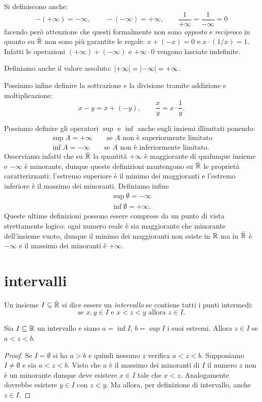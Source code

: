 Si definiscono anche:
\[
 -(+\infty) = -\infty, \qquad
 -(-\infty) = +\infty, \qquad
 \frac{1}{+\infty} = \frac{1}{-\infty}=0
\]
facendo però attenzione che
questi formalmente non sono \emph{opposto}
e \emph{reciproco} in quanto
su $\bar {{\mathbb R}}$ non sono più garantite
le regole: $x + (-x) = 0$ e $x \cdot (1/x) = 1$.
Infatti
le operazioni $(+\infty) + (-\infty)$ e $+\infty \cdot 0$ vengono
lasciate indefinite.

Definiamo anche il valore assoluto: ${\left|+\infty\right|} = {\left|-\infty\right|} = +\infty$.

Possiamo infine definire la sottrazione e la divisione tramite
addizione e moltiplicazione:
\[
  x - y = x + (-y), \qquad \frac{x}{y} = x \cdot \frac{1}{y}.
\]

Possiamo definire gli operatori $\sup$ e $\inf$
anche sugli insiemi illimitati ponendo:
\begin{align*}
  \sup A = +\infty \qquad \text{se $A$ non è superiormente limitato}\\
  \inf A = -\infty \qquad \text{se $A$ non è inferiormente limitato}.
\end{align*}
Osserviamo infatti che su $\bar {{\mathbb R}}$ la quantità $+\infty$
è maggiorante di qualunque insieme e $-\infty$ è minorante, dunque
queste definizioni mantengono su $\bar {{\mathbb R}}$ le proprietà caratterizzanti:
l'estremo superiore è il minimo dei maggioranti e
l'estremo inferiore è il massimo dei minoranti.
Definiamo infine
\begin{align*}
  \sup \emptyset = -\infty\\
  \inf \emptyset = +\infty.
\end{align*}
Queste ultime definizioni possono essere comprese da un punto di vista
strettamente logico: ogni numero reale è sia maggiorante che minorante
dell'insieme vuoto, dunque il minimo dei maggioranti non esiste in ${\mathbb R}$
ma in $\bar {{\mathbb R}}$ è $-\infty$
e il massimo dei minoranti è $+\infty$.

\section{intervalli}

\begin{definition}[intervallo]
\label{def:intervallo}%
%
%
Un insieme $I\subseteq \bar{{\mathbb R}}$ si dice essere un \emph{intervallo}
se contiene tutti i punti intermedi:
\[
  \text{se $x, y \in I$ e $x<z<y$ allora $z \in I$.}
\]
\end{definition}
%
\begin{theorem}
Sia $I\subseteq {\mathbb R}$ un intervallo e siano $a=\inf I$, $b=\sup I$
i suoi estremi. Allora
$z\in I$ se $a < z < b$.
\end{theorem}
%
\begin{proof}
Se $I=\emptyset$ si ha $a>b$ e quindi nessuno $z$ verifica $a<z<b$.
Supponiamo $I\neq \emptyset$ e
sia $a < z < b$.
Visto che $a$ è il massimo dei minoranti di $I$
il numero $z$ non è un minorante dunque
deve esistere $x \in I$ tale
che $x < z$. Analogamente dovrebbe esistere $y\in I$
con $z<y$.
Ma allora, per definizione di intervallo, anche $z\in I$.
\end{proof}

